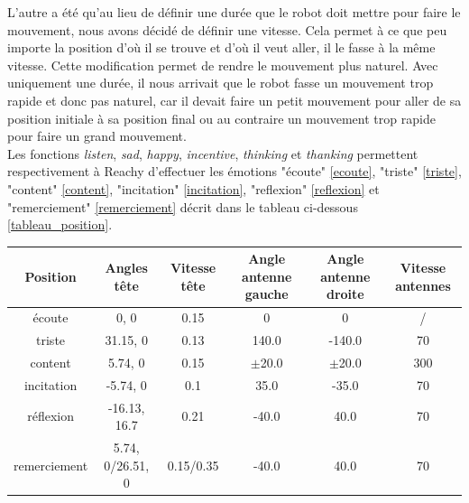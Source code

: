 \documentclass[a4paper,french]{article}
\begin{document}
L'autre a été qu'au lieu de définir une durée que le robot doit mettre pour faire le mouvement, nous avons décidé de définir une vitesse. Cela permet à ce que peu importe la position d'où il se trouve et d'où il veut aller, il le fasse à la même vitesse. Cette modification permet de rendre le mouvement plus naturel. Avec uniquement une durée, il nous arrivait que le robot fasse un mouvement trop rapide et donc pas naturel, car il devait faire un petit mouvement pour aller de sa position initiale à sa position final ou au contraire un mouvement trop rapide pour faire un grand mouvement.\\

Les fonctions \textit{listen}, \textit{sad}, \textit{happy}, \textit{incentive}, \textit{thinking} et \textit{thanking} permettent respectivement à Reachy d'effectuer les émotions "écoute" \ref{ecoute}, "triste" \ref{triste}, "content" \ref{content}, "incitation" \ref{incitation}, "reflexion" \ref{reflexion} et "remerciement" \ref{remerciement} décrit dans le tableau ci-dessous \ref{tableau_position}.

\begin{center}
\label{tableau_position}
    \begin{tabular}{| c | c | c | c | c | c |}
        \hline
        Position & Angles tête & Vitesse tête & Angle antenne gauche & Angle antenne droite & Vitesse antennes \\
        \hline
        écoute & 0, 0 & 0.15 & 0 & 0 & / \\
        triste & 31.15, 0 & 0.13 & 140.0 & -140.0 & 70 \\
        content & 5.74, 0 & 0.15 & $\pm$20.0 & $\pm$20.0 & 300 \\
        incitation & -5.74, 0 & 0.1 & 35.0 & -35.0 & 70 \\
        réflexion & -16.13, 16.7 & 0.21 & -40.0 & 40.0 & 70 \\
        remerciement & 5.74, 0/26.51, 0 & 0.15/0.35 & -40.0 & 40.0 & 70 \\
        \hline
    \end{tabular}
\end{center}
\end{document}
